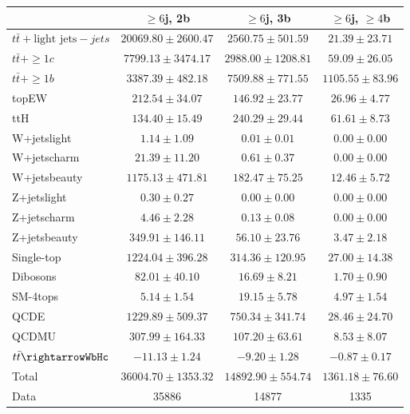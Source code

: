 \begin{table}
\begin{center}
  \begin{tabular}{ | l |  c |  c |  c | }
    \hline \hline 
     &  $\geq6$j, 2b  &  $\geq6$j, 3b  &  $\geq6$j, $\geq4$b  \\ 
    \hline 
     $t\bar{t}+\text{light jets}-jets$  &   $ 20069.80 \pm 2600.47 $ &   $ 2560.75 \pm 501.59 $ &   $ 21.39 \pm 23.71 $ \\ 
     $t\bar{t}+\geq1c$  &   $ 7799.13 \pm 3474.17 $ &   $ 2988.00 \pm 1208.81 $ &   $ 59.09 \pm 26.05 $ \\ 
     $t\bar{t}+\geq1b$  &   $ 3387.39 \pm 482.18 $ &   $ 7509.88 \pm 771.55 $ &   $ 1105.55 \pm 83.96 $ \\ 
    topEW  &   $ 212.54 \pm 34.07 $ &   $ 146.92 \pm 23.77 $ &   $ 26.96 \pm 4.77 $ \\ 
    ttH  &   $ 134.40 \pm 15.49 $ &   $ 240.29 \pm 29.44 $ &   $ 61.61 \pm 8.73 $ \\ 
    W+jetslight  &   $ 1.14 \pm 1.09 $ &   $ 0.01 \pm 0.01 $ &   $ 0.00 \pm 0.00 $ \\ 
    W+jetscharm  &   $ 21.39 \pm 11.20 $ &   $ 0.61 \pm 0.37 $ &   $ 0.00 \pm 0.00 $ \\ 
    W+jetsbeauty  &   $ 1175.13 \pm 471.81 $ &   $ 182.47 \pm 75.25 $ &   $ 12.46 \pm 5.72 $ \\ 
    Z+jetslight  &   $ 0.30 \pm 0.27 $ &   $ 0.00 \pm 0.00 $ &   $ 0.00 \pm 0.00 $ \\ 
    Z+jetscharm  &   $ 4.46 \pm 2.28 $ &   $ 0.13 \pm 0.08 $ &   $ 0.00 \pm 0.00 $ \\ 
    Z+jetsbeauty  &   $ 349.91 \pm 146.11 $ &   $ 56.10 \pm 23.76 $ &   $ 3.47 \pm 2.18 $ \\ 
    Single-top  &   $ 1224.04 \pm 396.28 $ &   $ 314.36 \pm 120.95 $ &   $ 27.00 \pm 14.38 $ \\ 
    Dibosons  &   $ 82.01 \pm 40.10 $ &   $ 16.69 \pm 8.21 $ &   $ 1.70 \pm 0.90 $ \\ 
    SM-4tops  &   $ 5.14 \pm 1.54 $ &   $ 19.15 \pm 5.78 $ &   $ 4.97 \pm 1.54 $ \\ 
    QCDE  &   $ 1229.89 \pm 509.37 $ &   $ 750.34 \pm 341.74 $ &   $ 28.46 \pm 24.70 $ \\ 
    QCDMU  &   $ 307.99 \pm 164.33 $ &   $ 107.20 \pm 63.61 $ &   $ 8.53 \pm 8.07 $ \\ 
     $t\bar{t}\rightarrowWbHc$  &   $ -11.13 \pm 1.24 $ &   $ -9.20 \pm 1.28 $ &   $ -0.87 \pm 0.17 $ \\ 
    Total  &   $ 36004.70 \pm 1353.32 $ &   $ 14892.90 \pm 554.74 $ &   $ 1361.18 \pm 76.60 $ \\ 
    \hline 
    Data  & 35886  & 14877  & 1335  \\ 
    \hline \hline 
  \end{tabular} 


\end{center}
\end{table}
